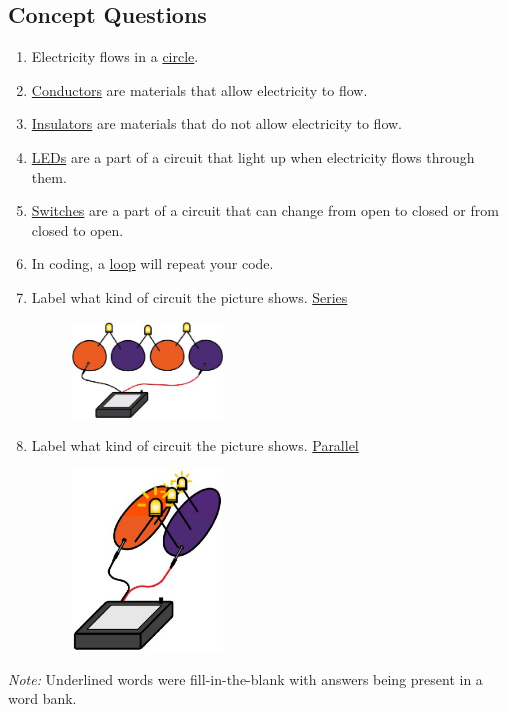 \documentclass[11.5pt]{sig-alternate}
\begin{document}
\begin{large}
\subsection*{Concept Questions}
\begin{enumerate}
\item Electricity flows in a \underline{circle}.
\item \underline{Conductors} are materials that allow electricity to flow.
\item \underline{Insulators} are materials that do not allow electricity to flow.
\item \underline{LEDs} are a part of a circuit that light up when electricity flows through them.
\item \underline{Switches} are a part of a circuit that can change from open to closed or from closed to open.
\item In coding, a \underline{loop} will repeat your code.
\item Label what kind of circuit the picture shows. \underline{Series}

\begin{figure}[h!]
\centering
\includegraphics[width=4cm]{image 1.png}
\end{figure}
\item Label what kind of circuit the picture shows. \underline{Parallel}

\begin{figure}[h!]
\centering
\includegraphics[width=4cm]{image 2.png}
\end{figure}
\end{enumerate}

\textit{Note:} Underlined words were fill-in-the-blank with answers being present in a word bank.
\end{large}
\end{document}

